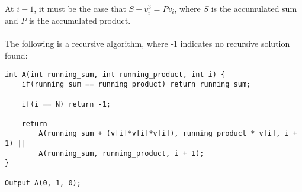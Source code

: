 \documentclass[letterpaper,notitlepage,twoside]{article}
\begin{document}
At $i - 1$, it must be the case that $S + v_i^3 = Pv_i$, where $S$ is the accumulated sum and $P$ is the accumulated product.\\\\

The following is a recursive algorithm, where -1 indicates no recursive solution found:
\begin{verbatim}
int A(int running_sum, int running_product, int i) {
    if(running_sum == running_product) return running_sum;
	
    if(i == N) return -1;

    return
        A(running_sum + (v[i]*v[i]*v[i]), running_product * v[i], i + 1) ||
        A(running_sum, running_product, i + 1);		
}

Output A(0, 1, 0);
\end{verbatim}
\end{document}
